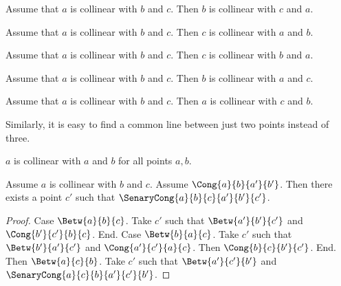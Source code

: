 \documentclass[10pt,a4paper,parskip=half,numbers=endperiod,parskip]{scrartcl}
\begin{document}
  \begin{forthel}
    \begin{lemma}
      Assume that $a$ is collinear with $b$ and $c$.
      Then $b$ is collinear with $c$ and $a$.
    \end{lemma}

    \begin{lemma}
      Assume that $a$ is collinear with $b$ and $c$.
      Then $c$ is collinear with $a$ and $b$.
    \end{lemma}

    \begin{lemma}
      Assume that $a$ is collinear with $b$ and $c$.
      Then $c$ is collinear with $b$ and $a$.
    \end{lemma}

    \begin{lemma}
      Assume that $a$ is collinear with $b$ and $c$.
      Then $b$ is collinear with $a$ and $c$.
    \end{lemma}

    \begin{lemma}
      Assume that $a$ is collinear with $b$ and $c$.
      Then $a$ is collinear with $c$ and $b$.
    \end{lemma}
  \end{forthel}

  Similarly, it is easy to find a common line between just two points instead of three.

  \begin{forthel}
    \begin{lemma} %
      $a$ is collinear with $a$ and $b$ for all points $a, b$.
    \end{lemma}

    \begin{lemma} %
      Assume $a$ is collinear with $b$ and $c$.
      Assume $\Cong{a}{b}{a'}{b'}$.
      Then there exists a point $c'$ such that $\SenaryCong{a}{b}{c}{a'}{b'}{c'}$.
    \end{lemma}
    \begin{proof}
      Case $\Betw{a}{b}{c}$.
      Take $c'$ such that $\Betw{a'}{b'}{c'}$ and $\Cong{b'}{c'}{b}{c}$.
      End.
      Case $\Betw{b}{a}{c}$.
      Take $c'$ such that $\Betw{b'}{a'}{c'}$ and $\Cong{a'}{c'}{a}{c}$.
      Then $\Cong{b}{c}{b'}{c'}$.
      End.
      Then $\Betw{a}{c}{b}$.
      Take $c'$ such that $\Betw{a'}{c'}{b'}$ and $\SenaryCong{a}{c}{b}{a'}{c'}{b'}$.
    \end{proof}
  \end{forthel}
\end{document}
